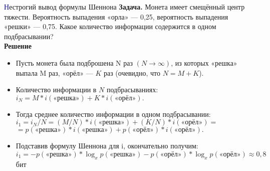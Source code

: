 \begin{frame}[t]{\textcolor{blue}{Н}естрогий вывод формулы Шеннона}
	\color[rgb]{0,0.7,0.4}
	\noindent\textbf{Задача.}
	\color{black}
	Монета имеет смещённый центр тяжести. Вероятность выпадения «орла» –-- 0,25, вероятность выпадения «решки» –-- 0,75. Какое количество информации содержится в одном подбрасывании?\\
	\vspace{0.5cm}
	\color[rgb]{0,0.7,0.4}
	\noindent\textbf{Решение}
	\color{black}
	\begin{itemize}
		\item[\textbullet] Пусть монета была подброшена N раз $(N\rightarrow\infty)$, из которых «решка» выпала M раз, «орёл» — $K$ раз (очевидно, что $N=M+K$).\\
		\item[\textbullet] Количество информации в $N$ подбрасываниях: $i_N = M*i(\mbox{«решка»})+K*i(\mbox{«орёл»}).$\\
		\item[\textbullet] Тогда среднее количество информации в одном подбрасывании:\\
		$i_1=i_N/N=(M/N)*i(\mbox{«решка»})+(K/N)*i(\mbox{«орёл»})=$\\
		$=p(\mbox{«решка»})*i(\mbox{«решка»})+p(\mbox{«орёл»})*i(\mbox{«орёл»}).$
		\item[\textbullet] Подставив формулу Шеннона для i, окончательно получим:\\
		$i_1=-p(\mbox{«решка»})*\log_xp(\mbox{«решка»})-p(\mbox{«орёл»})*\log_xp(\mbox{«орёл»})\approx0,8$ бит
	\end{itemize}
\end{frame}